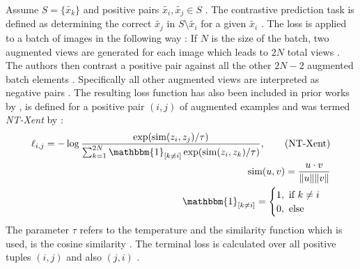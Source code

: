 Assume $S=\{{\tilde{x_k}}\}$ and positive pairs $\tilde{x_i}, \tilde{x_j} \in S$ \citep{Chen2020}.
The contrastive prediction task is defined as determining the correct $\tilde{x_j}$ in $S\setminus \tilde{x_i}$ for a given $\tilde{x_i}$ \citep{Chen2020}.
The loss is applied to a batch of images in the following way \citep{Chen2020}:
If $N$ is the size of the batch, two augmented views are generated for each image which leads to $2N$ total views \citep{Chen2020}.
The authors then contrast a positive pair against all the other $2N-2$ augmented batch elements \citep{Chen2020}.
Specifically all other augmented views are interpreted as negative pairs \citep{Chen2020}.
The resulting loss function has also been included in prior works by \citep{Sohn2016,Wu2018,Oord2018}, is defined for a positive pair $(i,j)$ of augmented examples and was termed \textit{NT-Xent} by \citep{Chen2017}:
\begin{align}
	\ell_{i,j} = -\log\frac{\exp(\text{sim}(z_i,z_j)/\tau)}{\sum_{k=1}^{2N} \mathbbm{1}_{[k \neq i]}\exp(\text{sim}(z_i,z_k)/\tau)}, \tag{NT-Xent}\\
	\text{sim}(u,v) = \frac{u\cdot v}{\Vert u \Vert \Vert v \Vert} \\
	\mathbbm{1}_{[k \neq i]} = \begin{cases}
		1, \text{ if } k \neq i \\
		0, \text{ else}
	\end{cases}
\end{align}
The parameter $\tau$ refers to the temperature and the similarity function which is used, is the cosine similarity \citep{Chen2020}.
The terminal loss is calculated over all positive tuples $(i,j)$ and also $(j,i)$ \citep{Chen2020}.
